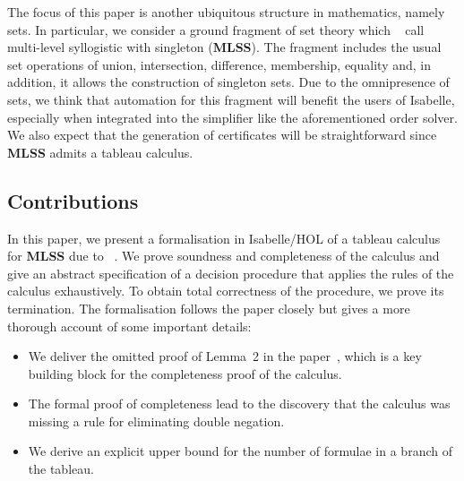 \documentclass[
  sigplan,
  10pt,
  ]{acmart}
\newcommand{\MLSS}{\textbf{MLSS}}
\begin{document}
The focus of this paper is another ubiquitous structure in mathematics, namely sets.
In particular, we consider a ground fragment of set theory which \citeauthor{new_fast_tableau}~\cite{new_fast_tableau} call multi-level syllogistic with singleton (\MLSS{}).
The fragment includes the usual set operations of union, intersection, difference, membership, equality and, in addition, it allows the construction of singleton sets.
Due to the omnipresence of sets, we think that automation for this fragment will benefit the users of Isabelle, especially when integrated into the simplifier like the aforementioned order solver.
We also expect that the generation of certificates will be straightforward since \MLSS{} admits a tableau calculus.

\subsection{Contributions}
In this paper, we present a formalisation in Isabelle/HOL of a tableau calculus for \MLSS{} due to \citeauthor{new_fast_tableau}~\cite{new_fast_tableau}\cite[Chapter 14]{set_theory}.
We prove soundness and completeness of the calculus and give an abstract specification of a decision procedure that applies the rules of the calculus exhaustively.
To obtain total correctness of the procedure, we prove its termination.
The formalisation follows the paper closely but gives a more thorough account of some important details:
\begin{itemize}
  \item We deliver the omitted proof of Lemma~2 in the paper~\cite{new_fast_tableau}, which is a key building block for the completeness proof of the calculus.
  \item The formal proof of completeness lead to the discovery that the calculus was missing a rule for eliminating double negation. 
  \item We derive an explicit upper bound for the number of formulae in a branch of the tableau.
\end{itemize}
\end{document}
